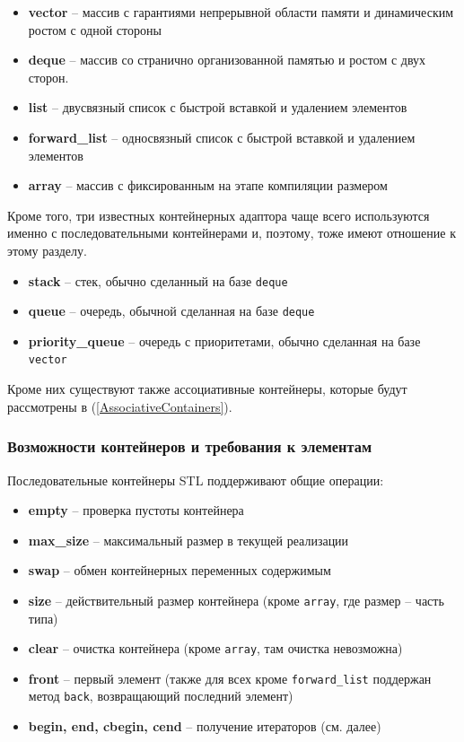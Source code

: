 \documentclass[a4paper,12pt,oneside]{article}
\begin{document}
\begin{itemize}
\item \textbf{vector} -- массив с гарантиями непрерывной области памяти и динамическим ростом с одной стороны
\item \textbf{deque} -- массив со странично организованной памятью и ростом с двух сторон.
\item \textbf{list} -- двусвязный список с быстрой вставкой и удалением элементов
\item \textbf{forward\_list} -- односвязный список с быстрой вставкой и удалением элементов
\item \textbf{array} -- массив с фиксированным на этапе компиляции размером
\end{itemize}

Кроме того, три известных контейнерных адаптора чаще всего используются именно с последовательными контейнерами и, поэтому, тоже имеют отношение к этому разделу.

\begin{itemize}
\item \textbf{stack} -- стек, обычно сделанный на базе \lstinline!deque!
\item \textbf{queue} -- очередь, обычной сделанная на базе \lstinline!deque!
\item \textbf{priority\_queue} -- очередь с приоритетами, обычно сделанная на базе \lstinline!vector!
\end{itemize}

Кроме них существуют также ассоциативные контейнеры, которые будут рассмотрены в (\ref{AssociativeContainers}).

\subsubsection{Возможности контейнеров и требования к элементам}\label{StandardOperations}

Последовательные контейнеры STL поддерживают общие операции: 

\begin{itemize}
\item \textbf{empty} -- проверка пустоты контейнера
\item \textbf{max\_size} -- максимальный размер в текущей реализации
\item \textbf{swap} -- обмен контейнерных переменных содержимым
\item \textbf{size} -- действительный размер контейнера (кроме \lstinline!array!, где размер -- часть типа)
\item \textbf{clear} -- очистка контейнера (кроме \lstinline!array!, там очистка невозможна)
\item \textbf{front} -- первый элемент (также для всех кроме \lstinline!forward_list! поддержан метод \lstinline!back!, возвращающий последний элемент)
\item \textbf{begin, end, cbegin, cend} -- получение итераторов (см. далее)
\end{itemize}
\end{document}
